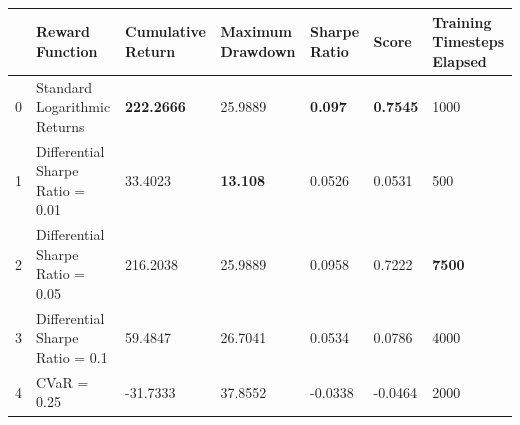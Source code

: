 \begin{tabular}{lllllll}
\toprule
 & Reward Function & Cumulative Return & Maximum Drawdown & Sharpe Ratio & Score & Training Timesteps Elapsed \\
\midrule
0 & Standard Logarithmic Returns & \textbf{222.2666} & 25.9889 & \textbf{0.097} & \textbf{0.7545} & 1000 \\
1 & Differential Sharpe Ratio = 0.01 & 33.4023 & \textbf{13.108} & 0.0526 & 0.0531 & 500 \\
2 & Differential Sharpe Ratio = 0.05 & 216.2038 & 25.9889 & 0.0958 & 0.7222 & \textbf{7500} \\
3 & Differential Sharpe Ratio = 0.1 & 59.4847 & 26.7041 & 0.0534 & 0.0786 & 4000 \\
4 & CVaR = 0.25 & -31.7333 & 37.8552 & -0.0338 & -0.0464 & 2000 \\
\bottomrule
\end{tabular}
